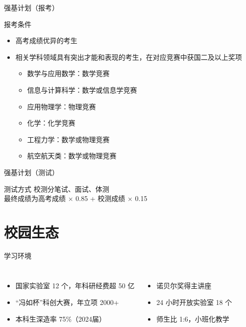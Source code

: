 \documentclass[
    12pt,
    aspectratio=169
]{beamer}
\begin{document}
\begin{frame}{强基计划（报考）}
    \begin{block}{报考条件}
        \rmfamily
        \begin{itemize}
            \item 高考成绩优异的考生
            \item 相关学科领域具有突出才能和表现的考生，在对应竞赛中获国二及以上奖项
            \begin{itemize}
                \item 数学与应用数学：数学竞赛
                \item 信息与计算科学：数学或信息学竞赛
                \item 应用物理学：物理竞赛
                \item 化学：化学竞赛
                \item 工程力学：数学或物理竞赛
                \item 航空航天类：数学或物理竞赛
            \end{itemize}
        \end{itemize}
    \end{block}
\end{frame}

\begin{frame}{强基计划（测试）}
    \rmfamily
    \begin{block}{测试方式}
        校测分笔试、面试、体测 \\
        最终成绩为高考成绩 $\times$ 0.85 + 校测成绩 $\times$ 0.15
    \end{block}
\end{frame}

\section{校园生态}

\begin{frame}{学习环境}
    \rmfamily
    \begin{columns}[T]
            \begin{itemize}
                \item 国家实验室 12 个，年科研经费超 50 亿
                \item “冯如杯”科创大赛，年立项 2000+
                \item 本科生深造率 75\%（2024届）
            \end{itemize}
            \begin{itemize}
                \item 诺贝尔奖得主讲座
                \item 24 小时开放实验室 18 个
                \item 师生比 1:6，小班化教学
            \end{itemize}
    \end{columns}
\end{frame}
\end{document}
